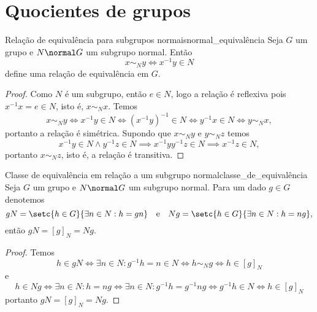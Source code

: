 \section{Quocientes de grupos}
\begin{proposition}{Relação de equivalência para subgrupos normais}{normal_equivalência}
    Seja \(G\) um grupo e \(N \normal G\) um subgrupo normal. Então
    \begin{equation*}
        x \sim_N y \iff x^{-1}y \in N
    \end{equation*}
    define uma relação de equivalência em \(G\).
\end{proposition}
\begin{proof}
    Como \(N\) é um subgrupo, então \(e \in N\), logo a relação é reflexiva pois \(x^{-1}x = e \in N\), isto é, \(x \sim_N x\). Temos
    \begin{equation*}
        x \sim_N y \iff x^{-1} y \in N \iff (x^{-1}y)^{-1} \in N \iff y^{-1}x \in N \iff y \sim_N x,
    \end{equation*}
    portanto a relação é simétrica. Supondo que \(x \sim_N y\) e \(y \sim_N z\) temos
    \begin{equation*}
        x^{-1}y \in N \land y^{-1}z \in N \implies x^{-1}y y^{-1} z \in N \implies x^{-1} z \in N,
    \end{equation*}
    portanto \(x \sim_N z\), isto é, a relação é transitiva.
\end{proof}

\begin{lemma}{Classe de equivalência em relação a um subgrupo normal}{classe_de_equivalência}
    Seja \(G\) um grupo e \(N\normal G\) um subgrupo normal. Para um dado \(g \in G\) denotemos
    \begin{equation*}
        gN = \setc{h \in G}{\exists n \in N : h = gn}\quad\text{e}\quad
        Ng = \setc{h \in G}{\exists n \in N : h = ng},
    \end{equation*}
    então \(gN = [g]_N = Ng\).
\end{lemma}
\begin{proof}
    Temos
    \begin{equation*}
        h \in gN \iff \exists n \in N : g^{-1}h = n \in N \iff h \sim_N g \iff h \in [g]_N
    \end{equation*}
    e
    \begin{equation*}
        h \in Ng \iff \exists n \in N : h = n g \iff \exists n \in N : g^{-1} h = g^{-1} n g \iff g^{-1} h \in N \iff h \in [g]_N
    \end{equation*}
    portanto \(gN = [g]_N = Ng\).
\end{proof}

